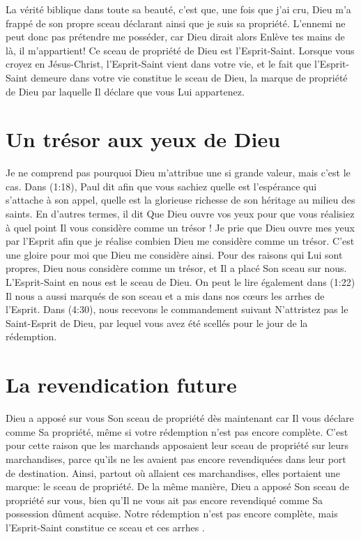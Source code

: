 La vérité biblique dans toute sa beauté, c'est que, une fois que j'ai cru,
 Dieu m'a frappé de son propre sceau déclarant ainsi que je suis sa propriété.
 L'ennemi ne peut donc pas prétendre me posséder, car Dieu dirait alors\frcolon{}
 \Og  Enlève tes mains de là, il m'appartient! \Fg{}
 Ce sceau de propriété de Dieu est l'Esprit-Saint.
 Lorsque vous croyez en Jésus-Christ, l'Esprit-Saint vient dans votre vie,
 et le fait que l'Esprit-Saint demeure dans votre vie
 constitue le sceau de Dieu, la marque de propriété de Dieu
 par laquelle Il déclare que vous Lui appartenez.


\section{Un tr\'esor aux yeux de Dieu}

Je ne comprend pas pourquoi Dieu m'attribue une si grande valeur,
 mais c'est le cas.
 Dans (1:18), Paul dit\frcolon{}
 \Og [\dots{}] afin que vous sachiez quelle est l'espérance
 qui s'attache à son appel, quelle est la glorieuse richesse
 de son héritage au milieu des saints. \Fg{}
 En d'autres termes, il dit\frcolon{}
 \Og Que Dieu ouvre vos yeux pour que vous réalisiez
 à quel point Il vous considère comme un trésor ! \Fg{}
 Je prie que Dieu ouvre mes yeux par l'Esprit afin que je réalise
 combien Dieu me considère comme un trésor. C'est une gloire pour moi que Dieu me considère ainsi.
 Pour des raisons qui Lui sont propres, Dieu nous considère comme un trésor,
 et Il a placé Son sceau sur nous.
 L'Esprit-Saint en nous est le sceau de Dieu.
 On peut le lire également dans (1:22)\frcolon{}
 \Og Il nous a aussi marqués de son sceau et a mis dans nos cœurs
 les arrhes de l'Esprit. \Fg{}
 Dans (4:30), nous recevons le commandement suivant\frcolon{}
 \Og N'attristez pas le Saint-Esprit de Dieu, par lequel
 vous avez été scellés pour le jour de la rédemption. \Fg{}


\section{La revendication future}

Dieu a apposé sur vous Son sceau de propriété dès maintenant
 car Il vous déclare comme Sa propriété, même si votre rédemption
 n'est pas encore complète.
 C'est pour cette raison que les marchands apposaient leur sceau de propriété
 sur leurs marchandises, parce qu'ils ne les avaient pas encore revendiquées
 dans leur port de destination. Ainsi, partout où allaient ces marchandises,
 elles portaient une marque: le sceau de propriété.
 De la même manière, Dieu a apposé Son sceau de propriété sur vous,
 bien qu'Il ne vous ait pas encore revendiqué comme Sa possession dûment acquise.
 Notre rédemption n'est pas encore complète,
 mais l'Esprit-Saint constitue ce sceau et \Og ces arrhes \Fg{}.

